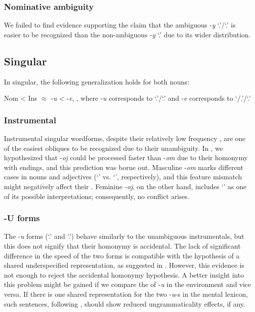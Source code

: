 \documentclass[output=paper, modfonts,newtxmath,hidelinks]{langscibook}
\begin{document}
\subsubsection{{Nominative ambiguity}}
We failed to find evidence supporting the claim that the ambiguous  -\textit{y} `\nomm.\pl'\slash `\genn.\sg' is easier to be recognized than the non-ambiguous  -\textit{y} `\nomm.\pl' due to its wider distribution.\\

\subsection{Singular} In singular, the following generalization holds for both nouns:

\ea	Nom < Ins $\approx$ -\textit{u} < -\textit{e}, , where -\textit{u} corresponds to `\accc.\fem'\slash `\datt.\masc' and -\textit{e} corresponds to `{\datt/\locc.\fem}’\slash `{\locc.\masc}’
\z 

\subsubsection{{Instrumental}} 
Instrumental singular wordforms, despite their relatively low frequency \citep{samojlova2014frequencies}, are one of the easiest obliques to be recognized due to their unambiguity. In , we hypothesized that   -\textit{oj} could be processed faster than   -\textit{om} due to their homonymy with  endings, and this prediction was borne out. Masculine -\textit{om} marks different cases in nouns and adjectives (`\ins' vs. `\locc', respectively), and this feature mismatch might negatively affect their . Feminine  -\textit{oj}, on the other hand, includes `\ins' as one of its possible interpretations; consequently, no conflict arises.

\subsubsection{{-U forms}} 
The -\textit{u} forms (`\accc.\fem' and `\datt.\masc') behave similarly to the unambiguous instrumentals, but this does not signify that their homonymy is accidental. The lack of significant difference in the  speed of the two forms  is compatible with the hypothesis of a shared underspecified representation, as suggested in  \citet{muller2004decomposing,wunderlich2004there}. However, this evidence is not enough to reject the accidental homonymy hypothesis. A better insight into this problem might be gained if we compare the  of  -\textit{u} in the  environment and vice versa. If there is one shared representation for the two -\textit{u}-s in the mental lexicon, such sentences, following \citet{penke2004psycholinguistic, opitz2013neurophysiological}, should show reduced ungrammaticality effects, if any.
\end{document}
